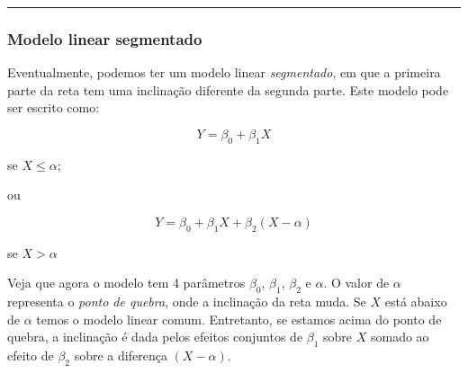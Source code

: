 \documentclass[
]{book}
\begin{document}
\begin{center}\rule{0.5\linewidth}{0.5pt}\end{center}

\hypertarget{modelo-linear-segmentado}{%
\subsubsection*{Modelo linear segmentado}\label{modelo-linear-segmentado}}

Eventualmente, podemos ter um modelo linear \emph{segmentado}, em que a primeira parte da reta tem uma inclinação diferente da segunda parte. Este modelo pode ser escrito como:

\[Y = \beta_0 + \beta_1X\]

se \(X \le \alpha\);

ou

\[Y = \beta_0 + \beta_{1}X + \beta_{2}(X - \alpha)\]

se \(X > \alpha\)

Veja que agora o modelo tem 4 parâmetros \(\beta_0\), \(\beta_1\), \(\beta_2\) e \(\alpha\). O valor de \(\alpha\) representa o \emph{ponto de quebra}, onde a inclinação da reta muda. Se \(X\) está abaixo de \(\alpha\) temos o modelo linear comum. Entretanto, se estamos acima do ponto de quebra, a inclinação é dada pelos efeitos conjuntos de \(\beta_1\) sobre \(X\) somado ao efeito de \(\beta_2\) sobre a diferença \((X - \alpha)\).
\end{document}
